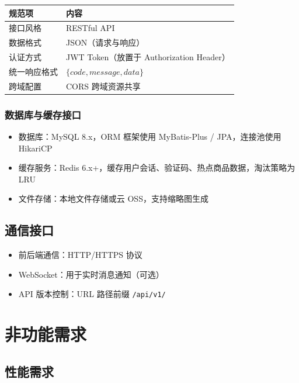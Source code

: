 \documentclass[12pt,a4paper,UTF8]{ctexart}
\begin{document}
\begin{longtable}{p{}|p{}}
    \toprule
    \textbf{规范项} & \textbf{内容} \\
    \midrule
    \endhead
    \bottomrule
    \endfoot

    接口风格 & RESTful API \\
    数据格式 & JSON（请求与响应） \\
    认证方式 & JWT Token（放置于 Authorization Header） \\
    统一响应格式 & $\{code, message, data\}$ \\
    跨域配置 & CORS 跨域资源共享 \\
\end{longtable}

\subsubsection{数据库与缓存接口}

\begin{itemize}[itemsep=3pt]
    \item 数据库：MySQL 8.x，ORM 框架使用 MyBatis-Plus / JPA，连接池使用 HikariCP
    \item 缓存服务：Redis 6.x+，缓存用户会话、验证码、热点商品数据，淘汰策略为 LRU
    \item 文件存储：本地文件存储或云 OSS，支持缩略图生成
\end{itemize}

\subsection{通信接口}

\begin{itemize}[itemsep=3pt]
    \item 前后端通信：HTTP/HTTPS 协议
    \item WebSocket：用于实时消息通知（可选）
    \item API 版本控制：URL 路径前缀 \texttt{/api/v1/}
\end{itemize}

\section{非功能需求}

\subsection{性能需求}
\end{document}

